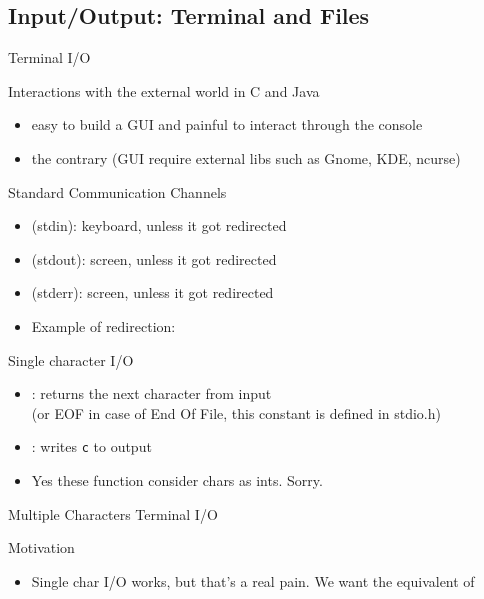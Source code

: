 \begin{Coupe}
\subsection{Input/Output: Terminal and Files}
\begin{frame}{Terminal I/O}
  \begin{block}{Interactions with the external world in C and Java}
    \begin{itemize}
    \item {} easy to build a GUI and painful to interact through the console
    \item {} the contrary (GUI require external libs such as Gnome,
      KDE, ncurse)
    \end{itemize}
  \end{block}

  \begin{block}{Standard Communication Channels}
    \begin{itemize}
    \item {} (stdin): keyboard, unless it got redirected
    \item {} (stdout): screen, unless it got redirected
    \item {} (stderr): screen, unless it got redirected
    \item Example of redirection: 
    \end{itemize}
  \end{block}

  \begin{block}{Single character I/O}
    \begin{itemize}
    \item {}: returns the next character from
      input \\(or EOF in case of End Of File, this constant is defined in stdio.h)
    \item {}: writes \texttt{c} to output
    \item Yes these function consider chars as ints. Sorry.
    \end{itemize}
  \end{block}
\end{frame}
\begin{frame}{Multiple Characters Terminal I/O}
  \begin{block}{Motivation}
    \begin{itemize}
    \item Single char I/O works, but that's a real pain. We want the equivalent
      of 


\end{itemize}
\end{block}
\end{frame}
\end{Coupe}
